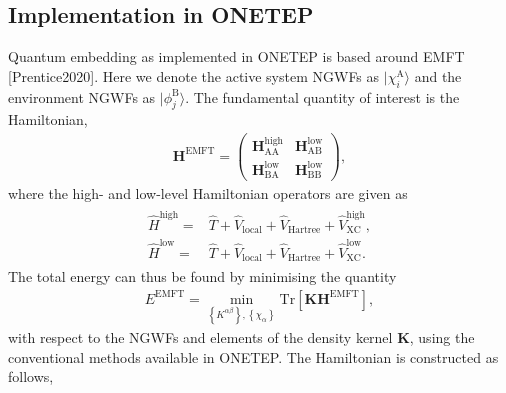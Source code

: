\documentclass[letterpaper,10pt,english]{sphinxmanual}
\begin{document}
\subsection{Implementation in ONETEP}
\label{\detokenize{EMFT_in_ONETEP:implementation-in-onetep}}
Quantum embedding as implemented in ONETEP is based around
EMFT {[}Prentice2020{]}. Here we denote the active system
NGWFs as \({\lvert\chi_i^\text{A}\rangle}\) and the environment NGWFs as
\({\lvert\phi_j^\text{B}\rangle}\). The fundamental quantity of interest is
the Hamiltonian,
\begin{equation*}
\begin{split}\textbf{H}^\text{EMFT}=\begin{pmatrix}
        \textbf{H}^\text{high}_\text{AA} & \textbf{H}^\text{low}_\text{AB} \\
        \textbf{H}^\text{low}_\text{BA} & \textbf{H}^\text{low}_\text{BB}
    \end{pmatrix},
    \label{eq:emft_ham}\end{split}
\end{equation*}
where the high- and low-level Hamiltonian operators are given as
\begin{equation*}
\begin{split}\begin{aligned}
    \hat{H}^\text{high}=&\hat{T}+\hat{V}_\text{local}+\hat{V}_\text{Hartree}+\hat{V}_\text{XC}^\text{high},\\
    \hat{H}^\text{low}=&\hat{T}+\hat{V}_\text{local}+\hat{V}_\text{Hartree}+\hat{V}_\text{XC}^\text{low}.\end{aligned}\end{split}
\end{equation*}
The total energy can thus be found by minimising the quantity
\begin{equation*}
\begin{split}E^\text{EMFT}=
    \min_{\left\{K^{\alpha\beta}\right\},\left\{\chi_\alpha\right\}}
    \text{Tr}\left[\textbf{K}\textbf{H}^\text{EMFT}\right],
    \label{eq:emft_energy}\end{split}
\end{equation*}
with respect to the NGWFs and elements of the density kernel
\(\textbf{K}\), using the conventional methods available in ONETEP.
The Hamiltonian is constructed as follows,
\end{document}
